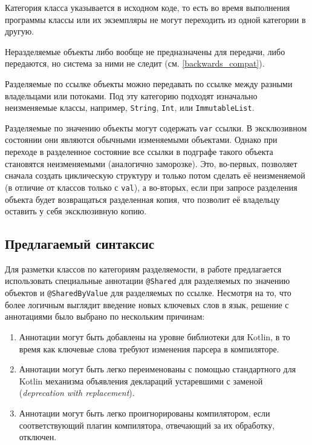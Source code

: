 \documentclass[specification,annotation,times]{itmo-student-thesis}
\begin{document}
Категория класса указывается в исходном коде, то есть во время выполнения программы классы или их экземпляры не могут переходить из одной категории в другую.

Неразделяемые объекты либо вообще не предназначены для передачи, либо передаются, но система за ними не следит (см. \ref{backwards_compat}).

Разделяемые по ссылке объекты можно передавать по ссылке между разными владельцами или потоками.
Под эту категорию подходят изначально неизменяемые классы, например, \texttt{String}, \texttt{Int}, или \texttt{ImmutableList}.

Разделяемые по значению объекты могут содержать \texttt{var} ссылки.
В эксклюзивном состоянии они являются обычными изменяемыми объектами.
Однако при переходе в разделенное состояние все ссылки в подграфе такого объекта становятся неизменяемыми (аналогично заморозке).
Это, во-первых, позволяет сначала создать циклическую структуру и только потом сделать её неизменяемой (в отличие от классов только с \texttt{val}),
а во-вторых, если при запросе разделения объекта будет возвращаться разделенная копия, что позволит её владельцу оставить у себя эксклюзивную копию.

\subsection{Предлагаемый синтаксис}\label{syntax_note}

Для разметки классов по категориям разделяемости, в работе предлагается использовать специальные аннотации \texttt{@Shared} для разделяемых по значению объектов и \texttt{@SharedByValue} для разделяемых по ссылке.
Несмотря на то, что более логичным выглядит введение новых ключевых слов в язык, решение с аннотациями было выбрано по нескольким причинам:

\begin{enumerate}
	\item Аннотации могут быть добавлены на уровне библиотеки для Kotlin, в то время как ключевые слова требуют изменения парсера в компиляторе.
	\item Аннотации могут быть легко переименованы с помощью стандартного для Kotlin механизма объявления деклараций устаревшими с заменой (\textit{deprecation with replacement}).
	\item Аннотации могут быть легко проигнорированы компилятором, если соответствующий плагин компилятора, отвечающий за их обработку, отключен.
\end{enumerate}
\end{document}
